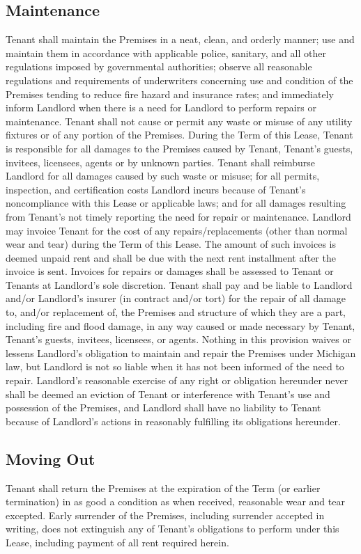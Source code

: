 \documentclass{article}
\begin{document}
\subsection{Maintenance}
Tenant shall maintain the Premises in a neat, clean, and orderly manner; use and
maintain them in accordance with applicable police, sanitary, and all other
regulations imposed by governmental authorities; observe all reasonable
regulations and requirements of underwriters concerning use and condition of the
Premises tending to reduce fire hazard and insurance rates; and immediately
inform Landlord when there is a need for Landlord to perform repairs or
maintenance. Tenant shall not cause or permit any waste or misuse of any utility
fixtures or of any portion of the Premises. During the Term of this Lease,
Tenant is responsible for all damages to the Premises caused by Tenant, Tenant’s
guests, invitees, licensees, agents or by unknown parties. Tenant shall
reimburse Landlord for all damages caused by such waste or misuse; for all
permits, inspection, and certification costs Landlord incurs because of Tenant’s
noncompliance with this Lease or applicable laws; and for all damages resulting
from Tenant’s not timely reporting the need for repair or maintenance. Landlord
may invoice Tenant for the cost of any repairs\slash replacements (other than
normal wear and tear) during the Term of this Lease. The amount of such invoices
is deemed unpaid rent and shall be due with the next rent installment after the
invoice is sent. Invoices for repairs or damages shall be assessed to Tenant or
Tenants at Landlord’s sole discretion. Tenant shall pay and be liable to
Landlord and/or Landlord’s insurer (in contract and/or tort) for the repair of
all damage to, and/or replacement of, the Premises and structure of which they
are a part, including fire and flood damage, in any way caused or made necessary
by Tenant, Tenant’s guests, invitees, licensees, or agents. Nothing in this
provision waives or lessens Landlord’s obligation to maintain and repair the
Premises under Michigan law, but Landlord is not so liable when it has not been
informed of the need to repair. Landlord’s reasonable exercise of any right or
obligation hereunder never shall be deemed an eviction of Tenant or interference
with Tenant’s use and possession of the Premises, and Landlord shall have no
liability to Tenant because of Landlord’s actions in reasonably fulfilling its
obligations hereunder.

\subsection{Moving Out}
Tenant shall return the Premises at the expiration of the Term (or earlier
termination) in as good a condition as when received, reasonable wear and tear
excepted. Early surrender of the Premises, including surrender accepted in
writing, does not extinguish any of Tenant’s obligations to perform under this
Lease, including payment of all rent required herein.
\end{document}

